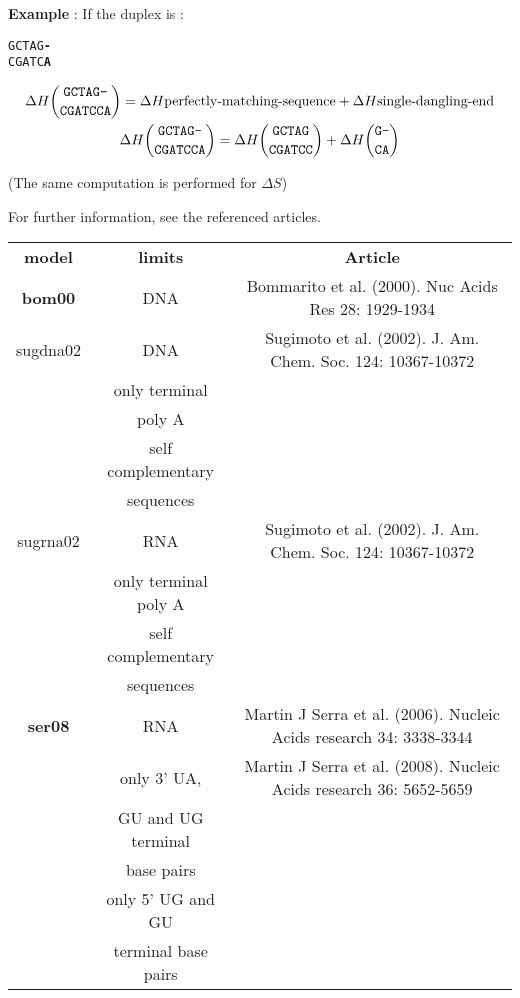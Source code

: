 \documentclass{article}
\begin{document}
\textbf{Example} :
If the duplex is :
\begin{alltt}
GCTAG\textbf{-}
CGATC\textbf{A}
\end{alltt}
\begin{multline*}
\Delta H {\mbox{\texttt{GCTAG-}} \choose \mbox{\texttt{CGATCCA}}} =
\Delta H {\mbox{perfectly-matching-sequence}} +
\Delta H {\mbox{single-dangling-end}} \\
\Delta H {\mbox{\texttt{GCTAG-}} \choose \mbox{\texttt{CGATCCA}}} =
\Delta H {\mbox{\texttt{GCTAG}} \choose \mbox{\texttt{CGATCC}}} +
\Delta H {\mbox{\texttt{G-}} \choose \mbox{\texttt{CA}}} \\
\end{multline*}


       (The same computation is performed for $\Delta S$)

For further information, see the referenced articles.

\begin{table}[h]
\begin{tabular}[h]{| c | c | c |}
\textbf{model} & \textbf{limits} & \textbf{Article} \\
\textbf{bom00} & DNA & Bommarito et al. (2000). Nuc Acids Res 28: 1929-1934 \\
sugdna02 & DNA & Sugimoto et al. (2002). J. Am. Chem. Soc. 124: 10367-10372 \\
 & only terminal & \\
 & poly A & \\
 & self complementary & \\
 & sequences & \\
sugrna02 & RNA & Sugimoto et al. (2002). J. Am. Chem. Soc. 124: 10367-10372 \\
 & only terminal poly A & \\
 & self complementary & \\
 & sequences & \\
\textbf{ser08} & RNA & Martin J Serra et al. (2006). Nucleic Acids research 34: 3338-3344 \\
 & only 3' UA, & Martin J Serra et al. (2008). Nucleic Acids research 36: 5652-5659 \\
 & GU and UG terminal & \\
 & base pairs & \\
 & only 5' UG and GU & \\
 & terminal base pairs & \\
\end{tabular}
\end{table}
\end{document}
